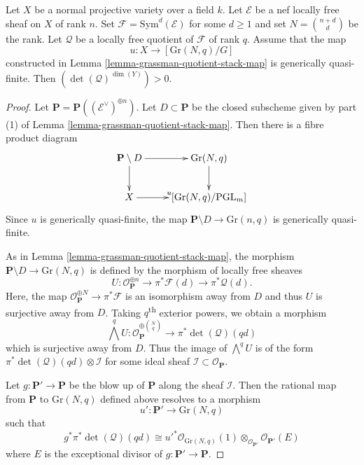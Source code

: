 \begin{lemma}
\label{lemma-positive-self-intersection}
Let $X$ be a normal projective variety over a field $k$.
Let $\mathcal{E}$ be a nef locally free sheaf on $X$ of rank $n$.
Set $\mathcal{F} = \mathrm{Sym}^d(\mathcal{E})$ for some $d \geq 1$ and set
$N = \binom{n + d}{d}$ be the rank.
Let $\mathcal{Q}$ be a locally free quotient of $\mathcal{F}$ of rank $q$.
Assume that the map
$$
  u : X \to [\mathrm{Gr}(N,q)/G]
$$
constructed in Lemma \ref{lemma-grassman-quotient-stack-map}
is generically quasi-finite.
Then $(\det(\mathcal{Q})^{\dim(Y)}) > 0$.
\end{lemma}

\begin{proof}
Let $\mathbf{P} = \mathbf{P}((\mathcal{E}^\vee)^{\oplus n})$.
Let $D \subset \mathbf{P}$ be the closed subscheme given by part (1) of
Lemma \ref{lemma-grassman-quotient-stack-map}.
Then there is a fibre product diagram
$$
\xymatrix{
  \mathbf{P} \setminus D \ar[r] \ar[d] & \mathrm{Gr}(N,q) \ar[d] \\
  X \ar[r]^u & [\mathrm{Gr}(N,q)/\mathrm{PGL}_m]
}
$$
Since $u$ is generically quasi-finite, the map
$\mathbf{P} \setminus D \to \mathrm{Gr}(n,q)$ is generically quasi-finite.

As in Lemma \ref{lemma-grassman-quotient-stack-map},
the morphism $\mathbf{P} \setminus D \to \mathrm{Gr}(N,q)$ is defined by
the morphism of locally free sheaves
$$
  U : \mathcal{O}_{\mathbf{P}}^{\oplus n} \to \pi^*\mathcal{F}(d)
                                          \to \pi^*\mathcal{Q}(d).
$$
Here, the map $\mathcal{O}_{\mathbf{P}}^{\oplus N} \to \pi^*\mathcal{F}$ is
an isomorphism away from $D$ and thus $U$ is surjective away from $D$.
Taking $q$\textsuperscript{th} exterior powers, we obtain a morphism
$$
  \bigwedge^q U : \mathcal{O}_{\mathbf{P}}^{\oplus \binom{N}{q}} \to
    \pi^*\det(\mathcal{Q})(qd)
$$
which is surjective away from $D$.
Thus the image of $\bigwedge^q U$ is of the form
$\pi^*\det(\mathcal{Q})(qd) \otimes \mathcal{I}$ for some ideal sheaf
$\mathcal{I} \subset \mathcal{O}_{\mathbf{P}}$.

Let $g : \mathbf{P}' \to \mathbf{P}$ be the blow up of $\mathbf{P}$ along the
sheaf $\mathcal{I}$.
Then the rational map from $\mathbf{P}$ to $\mathrm{Gr}(N,q)$ defined above
resolves to a morphism
$$
  u' : \mathbf{P}' \to \mathrm{Gr}(N,q)
$$
such that
$$
  g^*\pi^*\det(\mathcal{Q})(qd) \cong
    u'^*\mathcal{O}_{\mathrm{Gr}(N,q)}(1)
      \otimes_{\mathcal{O}_{\mathbf{P}'}}
    \mathcal{O}_{\mathbf{P}'}(E)
$$
where $E$ is the exceptional divisor of $g : \mathbf{P}' \to \mathbf{P}$.


\end{proof}
